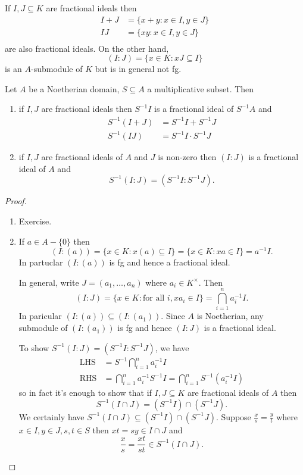 \documentclass[a4paper]{article}
\begin{document}
If \(I, J \subseteq K\) are fractional ideals then
\begin{align*}
  I + J &= \{x + y: x \in I, y \in J\} \\
  IJ &= \{xy: x \in I, y \in J\} \\
\end{align*}
are also fractional ideals. On the other hand,
\[
  (I: J) = \{x \in K: xJ \subseteq I\}
\]
is an \(A\)-submodule of \(K\) but is in general not fg.

\begin{lemma}
  Let \(A\) be a Noetherian domain, \(S \subseteq A\) a multiplicative subset. Then
  \begin{enumerate}
  \item if \(I, J\) are fractional ideals then \(S^{-1}I\) is a fractional ideal of \(S^{-1}A\) and
    \begin{align*}
      S^{-1}(I + J) &= S^{-1}I + S^{-1}J \\
      S^{-1}(IJ) &= S^{-1}I \cdot S^{-1}J
    \end{align*}
  \item if \(I, J\) are fractional ideals of \(A\) and \(J\) is non-zero then \((I : J)\) is a fractional ideal of \(A\) and
    \[
      S^{-1}(I : J) = (S^{-1}I : S^{-1}J).
    \]
  \end{enumerate}
\end{lemma}

\begin{proof}\leavevmode
  \begin{enumerate}
  \item Exercise.
  \item If \(a \in A - \{0\}\) then
    \[
      (I : (a)) = \{x \in K: x(a) \subseteq I\} = \{x \in K: xa \in I\} = a^{-1}I.
    \]
    In partuclar \((I : (a))\) is fg and hence a fractional ideal.

    In general, write \(J = (a_1, \dots, a_n)\) where \(a_i \in K^\times\). Then
    \[
      (I : J) = \{x \in K: \text{for all } i, xa_i \in I\} = \bigcap_{i = 1}^n a_i^{-1}I.
    \]
    In paricular \((I : (a)) \subseteq (I : (a_1))\). Since \(A\) is Noetherian, any submodule of \((I : (a_1))\) is fg and hence \((I : J)\) is a fractional ideal.

    To show \(S^{-1}(I : J) = (S^{-1}I : S^{-1}J)\), we have
    \begin{align*}
      \text{LHS} &= S^{-1} \bigcap_{i = 1}^n a_i^{-1} I \\
      \text{RHS} &= \bigcap_{i = 1}^n a_i^{-1} S^{-1} I = \bigcap_{i = 1}^n S^{-1} (a_i^{-1} I)
    \end{align*}
    so in fact it's enough to show that if \(I, J \subseteq K\) are fractional ideals of \(A\) then
    \[
      S^{-1}(I \cap J) = (S^{-1}I) \cap (S^{-1}J).
    \]
    We certainly have \(S^{-1}(I \cap J) \subseteq (S^{-1}I) \cap (S^{-1}J)\). Suppose \(\frac{x}{s} = \frac{y}{t}\) where \(x \in I, y \in J, s, t \in S\) then \(xt = sy \in I \cap J\) and
    \[
      \frac{x}{s} = \frac{xt}{st} \in S^{-1}(I \cap J).
    \]
  \end{enumerate}
\end{proof}
\end{document}
